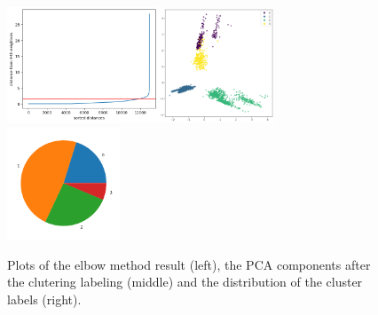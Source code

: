 \documentclass[10pt,a4paper]{report}
\begin{document}
\begin{figure}[h]
	\centering
	\includegraphics[width=0.4\textwidth]{dbscan_elbow}\includegraphics[width=0.31\textwidth]{dbscan_pca}\includegraphics[width=0.3\textwidth]{dbscan_distribution}
	\caption{Plots of the elbow method result (left), the PCA components after the clutering labeling (middle) and the distribution of the cluster labels (right).}
	\label{dbscan_elbow}
\end{figure}
\end{document}
